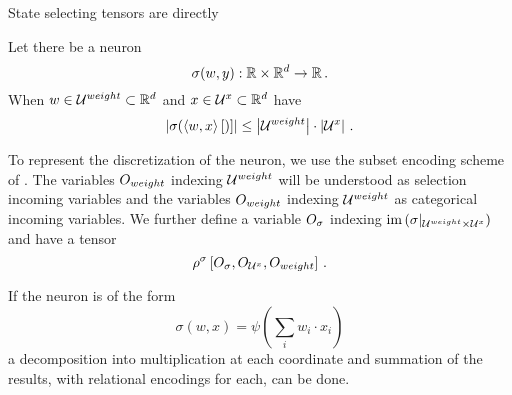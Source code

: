 State selecting tensors are directly 


\begin{example}
	Let there be a neuron
		\[ \sigma( w, y) : \mathbb{R} \times \mathbb{R}^{d} \rightarrow \mathbb{R} \, .\]
	When $w \in \mathcal{U}^{weight}\subset \mathbb{R}^{d}$ and $x \in \mathcal{U}^{x}\subset \mathbb{R}^{d}$ have
		\[ \left|\sigma( \left\langle w, x\right\rangle \left[ ) \right]\right| \leq \left|\mathcal{U}^{weight}\right| \cdot \left|\mathcal{U}^{x}\right| \, . \] 

	To represent the discretization of the neuron, we use the subset encoding scheme of .
	The variables $O_{weight}$ indexing $\mathcal{U}^{weight}$ will be understood as selection incoming variables and the variables $O_{weight}$ indexing $\mathcal{U}^{weight}$ as categorical incoming variables.
	We further define a variable $O_{\sigma}$ indexing $\mathrm{im}\left({\sigma}|_{\mathcal{U}^{weight}\times\mathcal{U}^{x}}\right)$ and have a tensor
		\[ \rho^{\sigma}\left[O_{\sigma},O_{\mathcal{U}^{x}},O_{weight}\right] \, . \] 

	If the neuron is of the form
		\[ \sigma(w,x) = \psi(\sum_i w_i \cdot x_i)\]
	a decomposition into multiplication at each coordinate and summation of the results, with relational encodings for each, can be done.
\end{example}
